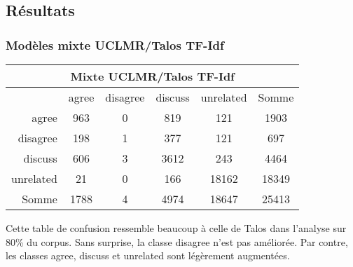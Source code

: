\documentclass[onecolumn, 12pt]{article}
\begin{document}
\subsection{Résultats}

\subsubsection{Modèles mixte UCLMR/Talos TF-Idf}

\begin{center}
 \begin{tabular}{ r | c c c c | c }
  \multicolumn{6}{c}{Mixte UCLMR/Talos TF-Idf}               \\
  \hline
            & agree & disagree & discuss & unrelated & Somme \\
  \hline
  agree     & 963   & 0        & 819     & 121       & 1903  \\
  disagree  & 198   & 1        & 377     & 121       & 697   \\
  discuss   & 606   & 3        & 3612    & 243       & 4464  \\
  unrelated & 21    & 0        & 166     & 18162     & 18349 \\
  \hline
  Somme     & 1788  & 4        & 4974    & 18647     & 25413 \\
 \end{tabular}
\end{center}
Cette table de confusion ressemble beaucoup à celle de Talos dans l'analyse sur 80\% du corpus.
Sans surprise, la classe disagree n'est pas améliorée.
Par contre, les classes agree, discuss et unrelated sont légèrement augmentées.
\end{document}
